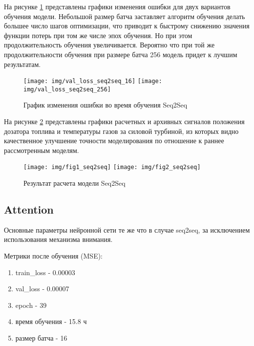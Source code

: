 \documentclass[12pt,a4paper]{article}
\begin{document}
На рисунке \ref{fig:val_loss_seq2seq} представлены графики изменения ошибки для двух вариантов обучения модели. Небольшой размер батча заставляет алгоритм обучения делать большее число шагов оптимизации, что приводит к быстрому снижению значения функции потерь при том же числе эпох обучения. Но при этом продолжительность обучения увеличивается. Вероятно что при той же продолжительности обучения при размере батча 256 модель придет к лучшим результатам. 

\begin{figure}[htb]
	\centering\texttt{[image: img/val\_loss\_seq2seq\_16]}
	\centering\texttt{[image: img/val\_loss\_seq2seq\_256]}
	\caption{График изменения ошибки во время обучения Seq2Seq}
	\label{fig:val_loss_seq2seq}
\end{figure}

На рисунке \ref{fig:res_seq2seq} представлены графики расчетных и архивных сигналов положения дозатора топлива и температуры газов за силовой турбиной, из которых видно качественное улучшение точности моделирования по отношение к раннее рассмотренным моделям.

\begin{figure}[htb]
	\centering\texttt{[image: img/fig1\_seq2seq]}
	\centering\texttt{[image: img/fig2\_seq2seq]}
	\caption{Результат расчета модели Seq2Seq}
	\label{fig:res_seq2seq}
\end{figure}


\subsection{Attention}

Основные параметры нейронной сети те же что в случае seq2seq, за исключением использования механизма внимания.

\begin{description}
	\item Метрики после обучения (MSE):
	\renewcommand\labelenumi{}
	\begin{enumerate}
		\item train\_loss - 0.00003
		\item val\_loss - 0.00007
		\item epoch - 39
		\item время обучения - 15.8 ч
		\item размер батча - 16
	\end{enumerate}
\end{description}
\end{document}
